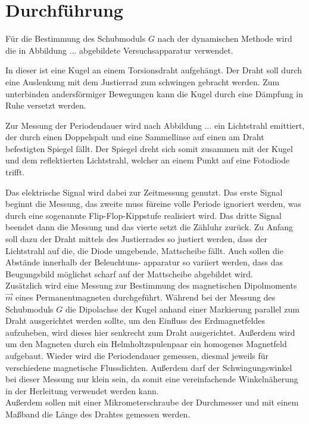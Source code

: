 \section{Durchführung}
\label{sec:Durchführung}

Für die Bestimmung des Schubmoduls $G$ nach der dynamischen Methode wird die in Abbildung ... abgebildete
Versuchsapparatur verwendet. 

In dieser ist eine Kugel an einem Torsionsdraht aufgehängt. Der Draht soll durch eine Auslenkung
mit dem Justierrad zum schwingen gebracht werden. Zum unterbinden andersförmiger Bewegungen
kann die Kugel durch eine Dämpfung in Ruhe versetzt werden.

Zur Messung der Periodendauer wird nach Abbildung ... ein Lichtstrahl emittiert, 
der durch einen Doppelspalt und eine Sammellinse auf einen am Draht befestigten Spiegel fällt. 
Der Spiegel dreht sich somit zusammen mit der Kugel und dem reflektierten Lichtstrahl, 
welcher an einem Punkt auf eine Fotodiode trifft.

Das elektrische Signal wird dabei zur Zeitmessung genutzt. Das erste Signal beginnt die Messung,
das zweite muss füreine volle Periode ignoriert werden, was durch eine sogenannte Flip-Flop-Kippstufe realisiert wird.
Das dritte Signal beendet dann die Messung und das vierte setzt die Zähluhr zurück. 
Zu Anfang soll dazu der Draht mittels des Justierrades so justiert werden, dass der Lichtstrahl
auf die, die Diode umgebende, Mattscheibe fällt. Auch sollen die Abstände innerhalb der Beleuchtuns-
apparatur so variiert werden, dass das Beugungsbild möglichst scharf auf der Mattscheibe abgebildet wird.\\

Zusätzlich wird eine Messung zur Bestimmung des magnetischen Dipolmoments $\vec{m}$ eines Permanentmagneten
durchgeführt. Während bei der Messung des Schubmoduls $G$ die Dipolachse der Kugel anhand einer Markierung
parallel zum Draht ausgerichtet werden sollte, um den Einfluss des Erdmagnetfeldes aufzuheben, wird
dieses hier senkrecht zum Draht ausgerichtet. Außerdem wird um den Magneten durch ein Helmholtzspulenpaar
ein homogenes Magnetfeld aufgebaut. Wieder wird die Periodendauer gemessen, diesmal jeweils für verschiedene
magnetische Flussdichten. Außerdem darf der Schwingungswinkel bei dieser Messung nur klein sein, da somit eine 
vereinfachende Winkelnäherung in der Herleitung verwendet werden kann.\\

Außerdem sollen mit einer Mikrometerschraube der Durchmesser und mit einem Maßband die Länge des Drahtes gemessen werden.



